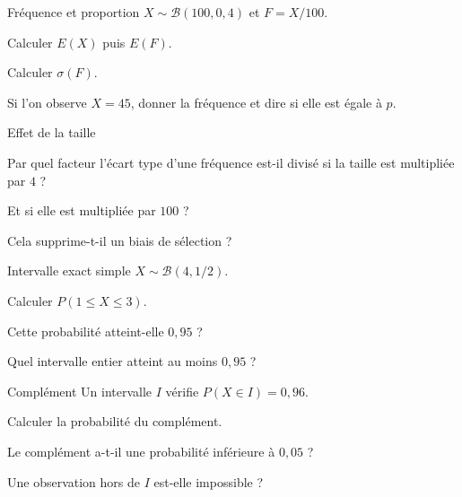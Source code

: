 \exercices
{}
\begingroup\renewcommand{\otBesoinPlace}[1]{}\begin{minipage}{\linewidth}
\begin{exercice}[1]{Fréquence et proportion}
$X\sim\mathcal B(100,0{,}4)$ et $F=X/100$.
\begin{questions}
\item Calculer $E(X)$ puis $E(F)$.
\item Calculer $\sigma(F)$.
\item Si l’on observe $X=45$, donner la fréquence et dire si elle est égale à $p$.
\end{questions}
\end{exercice}
\begin{exercice}[1]{Effet de la taille}

\begin{questions}
\item Par quel facteur l’écart type d’une fréquence est-il divisé si la taille est multipliée par $4$ ?
\item Et si elle est multipliée par $100$ ?
\item Cela supprime-t-il un biais de sélection ?
\end{questions}
\end{exercice}
\begin{exercice}[1]{Intervalle exact simple}
$X\sim\mathcal B(4,1/2)$.
\begin{questions}
\item Calculer $P(1\leq X\leq3)$.
\item Cette probabilité atteint-elle $0{,}95$ ?
\item Quel intervalle entier atteint au moins $0{,}95$ ?
\end{questions}
\end{exercice}
\begin{exercice}[1]{Complément}
Un intervalle $I$ vérifie $P(X\in I)=0{,}96$.
\begin{questions}
\item Calculer la probabilité du complément.
\item Le complément a-t-il une probabilité inférieure à $0{,}05$ ?
\item Une observation hors de $I$ est-elle impossible ?
\end{questions}
\end{exercice}
\end{minipage}\endgroup
\clearpage
{}
